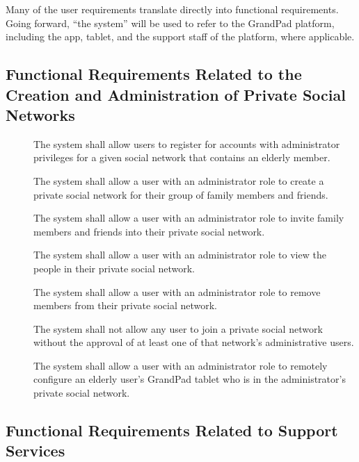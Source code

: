 Many of the user requirements translate directly into functional requirements.
Going forward, ``the system'' will be used to refer to the GrandPad platform,
    including the app, tablet, and the support staff of the platform, where
    applicable.

\subsection*{Functional Requirements Related to the Creation and Administration of Private Social Networks}

\begin{description}
    \item[\textbf{\showfuncnetcounter}]
        The system shall allow users to register for accounts with
            administrator privileges for a given social network that contains an
            elderly member.
    \item[\textbf{\showfuncnetcounter}]
        The system shall allow a user with an administrator role to create a
            private social network for their group of family members and
            friends.
    \item[\textbf{\showfuncnetcounter}]
        The system shall allow a user with an administrator role to invite
            family members and friends into their private social network.
    \item[\textbf{\showfuncnetcounter}]
        The system shall allow a user with an administrator role to view the
            people in their private social network.
    \item[\textbf{\showfuncnetcounter}]
        The system shall allow a user with an administrator role to remove
            members from their private social network.
    \item[\textbf{\showfuncnetcounter}]
        The system shall not allow any user to join a private social network
            without the approval of at least one of that network's
            administrative users.
    \item[\textbf{\showfuncnetcounter}]
        The system shall allow a user with an administrator role to remotely
            configure an elderly user's GrandPad tablet who is in the
            administrator's private social network.
\end{description}

\subsection*{Functional Requirements Related to Support Services}


